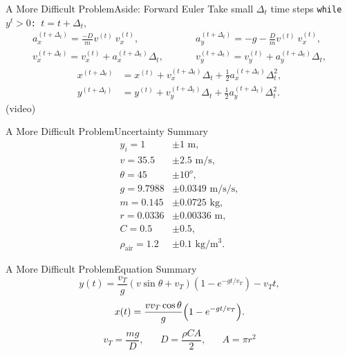 \documentclass{beamer}
\begin{document}
\begin{frame}{A More Difficult Problem}{Aside: Forward Euler}
\vspace{-20pt}Take small $\Delta_t$ time steps
\texttt{while $y^t>0$: $t=t+\Delta_t,$}
\begin{align*}
a_{x}^{(t+\Delta_t)} = \frac{-D}{m}v^{(t)}\ v^{(t)}_{x},
        &\hspace{30pt}a_{y}^{(t+\Delta_t)} = -g-\frac{D}{m}v^{(t)}\ v^{(t)}_{x},\\[15pt]
v_{x}^{(t+\Delta_t)} =v_{x}^{(t)}+ a_{x}^{(t+\Delta_t)}\Delta_t,
        &\hspace{30pt}v_{y}^{(t+\Delta_t)} =v_{y}^{(t)}+ a_{y}^{(t+\Delta_t)}\Delta_t,
        \end{align*}
        \begin{align*}
x^{(t+\Delta_t)} &=x^{(t)}+ v^{(t+\Delta_t)}_{x}\Delta_t + \frac{1}{2}a^{(t+\Delta_t)}_{x} \Delta_t^2,\\
y^{(t+\Delta_t)} &=y^{(t)}+ v^{(t+\Delta_t)}_{y}\Delta_t + \frac{1}{2}a^{(t+\Delta_t)}_{y} \Delta_t^2.
\end{align*}
\hspace{50pt}(video)
\end{frame}

\begin{frame}[label=unc_sum]{A More Difficult Problem}{Uncertainty Summary}\vspace{-30pt}
\begin{align*}
y_i=1&\pm1\text{ m},\\
v=35.5&\pm2.5\text{ m/s},\\
\theta=45&\pm10^o,\\
g=9.7988&\pm0.0349\text{ m/s/s},\\
m=0.145&\pm0.0725\text{ kg},\\
r=0.0336&\pm0.00336\text{ m},\\
C=0.5&\pm0.5,\\
\rho_\text{air}=1.2&\pm0.1\text{ kg/m$^3$}.
\end{align*}
\begin{center}\hyperlink{sens_res}{}\end{center}
\end{frame}

\begin{frame}{A More Difficult Problem}{Equation Summary}
\begin{equation*}
y(t)=\frac{v_T}{g}(v\sin\theta+v_T)\left(1-e^{-gt/v_T}\right)-v_Tt,
\end{equation*}\vspace{15pt}
\begin{equation*}
x(t)=\frac{vv_T\cos\theta}{g}\qty(1-e^{-gt/v_T}).
\end{equation*}\vspace{15pt}
\begin{equation*}
v_T=\frac{mg}{D},\hspace{20pt}D=\frac{\rho C A}{2},\hspace{20pt}A=\pi r^2
\end{equation*}
\end{frame}
\end{document}
